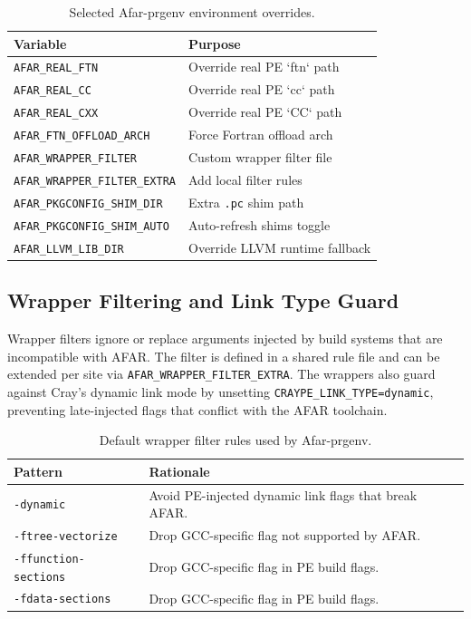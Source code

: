 \begin{table}[t]
  \centering
  \small
  \setlength{\tabcolsep}{4pt}
  \caption{Selected Afar-prgenv environment overrides.}
  \label{tab:env-overrides}
  \begin{tabular}{l l}
    \hline
    Variable & Purpose \\
    \hline
    \texttt{AFAR\_REAL\_FTN} & Override real PE `ftn` path \\
    \texttt{AFAR\_REAL\_CC} & Override real PE `cc` path \\
    \texttt{AFAR\_REAL\_CXX} & Override real PE `CC` path \\
    \texttt{AFAR\_FTN\_OFFLOAD\_ARCH} & Force Fortran offload arch \\
    \texttt{AFAR\_WRAPPER\_FILTER} & Custom wrapper filter file \\
    \texttt{AFAR\_WRAPPER\_FILTER\_EXTRA} & Add local filter rules \\
    \texttt{AFAR\_PKGCONFIG\_}\allowbreak\texttt{SHIM\_DIR} & Extra \texttt{.pc} shim path \\
    \texttt{AFAR\_PKGCONFIG\_}\allowbreak\texttt{SHIM\_AUTO} & Auto-refresh shims toggle \\
    \texttt{AFAR\_LLVM\_LIB\_DIR} & Override LLVM runtime fallback \\
    \hline
  \end{tabular}
\end{table}

\subsection{Wrapper Filtering and Link Type Guard}
\label{sec:wrapper-filter}
Wrapper filters ignore or replace arguments injected by build systems that are
incompatible with AFAR. The filter is defined in a shared rule file and can be
extended per site via \texttt{AFAR\_WRAPPER\_}\allowbreak\texttt{FILTER\_EXTRA}. The wrappers also
guard against Cray's dynamic link mode by unsetting
\texttt{CRAYPE\_LINK\_TYPE=dynamic}, preventing late-injected flags that
conflict with the AFAR toolchain.

\begin{table}[t]
  \centering
  \small
  \setlength{\tabcolsep}{4pt}
  \caption{Default wrapper filter rules used by Afar-prgenv.}
  \label{tab:wrapper-filter}
  \begin{tabular}{l p{}}
    \hline
    Pattern & Rationale \\
    \hline
    \texttt{-dynamic} & Avoid PE-injected dynamic link flags that break AFAR. \\
    \texttt{-ftree-vectorize} & Drop GCC-specific flag not supported by AFAR. \\
    \texttt{-ffunction-sections} & Drop GCC-specific flag in PE build flags. \\
    \texttt{-fdata-sections} & Drop GCC-specific flag in PE build flags. \\
    \hline
  \end{tabular}
\end{table}

